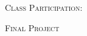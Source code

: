 \begin{description}

  \item \textsc{Class Participation:} 

  \item \textsc{Final Project}

\end{description}
